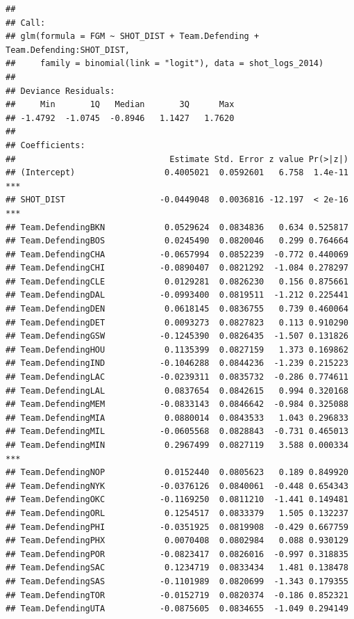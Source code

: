 \documentclass[
]{book}
\theoremstyle{definition}
\theoremstyle{definition}
\theoremstyle{definition}
\theoremstyle{definition}
\theoremstyle{remark}
\begin{document}
\begin{verbatim}
## 
## Call:
## glm(formula = FGM ~ SHOT_DIST + Team.Defending + Team.Defending:SHOT_DIST, 
##     family = binomial(link = "logit"), data = shot_logs_2014)
## 
## Deviance Residuals: 
##     Min       1Q   Median       3Q      Max  
## -1.4792  -1.0745  -0.8946   1.1427   1.7620  
## 
## Coefficients:
##                               Estimate Std. Error z value Pr(>|z|)    
## (Intercept)                  0.4005021  0.0592601   6.758  1.4e-11 ***
## SHOT_DIST                   -0.0449048  0.0036816 -12.197  < 2e-16 ***
## Team.DefendingBKN            0.0529624  0.0834836   0.634 0.525817    
## Team.DefendingBOS            0.0245490  0.0820046   0.299 0.764664    
## Team.DefendingCHA           -0.0657994  0.0852239  -0.772 0.440069    
## Team.DefendingCHI           -0.0890407  0.0821292  -1.084 0.278297    
## Team.DefendingCLE            0.0129281  0.0826230   0.156 0.875661    
## Team.DefendingDAL           -0.0993400  0.0819511  -1.212 0.225441    
## Team.DefendingDEN            0.0618145  0.0836755   0.739 0.460064    
## Team.DefendingDET            0.0093273  0.0827823   0.113 0.910290    
## Team.DefendingGSW           -0.1245390  0.0826435  -1.507 0.131826    
## Team.DefendingHOU            0.1135399  0.0827159   1.373 0.169862    
## Team.DefendingIND           -0.1046288  0.0844236  -1.239 0.215223    
## Team.DefendingLAC           -0.0239311  0.0835732  -0.286 0.774611    
## Team.DefendingLAL            0.0837654  0.0842615   0.994 0.320168    
## Team.DefendingMEM           -0.0833143  0.0846642  -0.984 0.325088    
## Team.DefendingMIA            0.0880014  0.0843533   1.043 0.296833    
## Team.DefendingMIL           -0.0605568  0.0828843  -0.731 0.465013    
## Team.DefendingMIN            0.2967499  0.0827119   3.588 0.000334 ***
## Team.DefendingNOP            0.0152440  0.0805623   0.189 0.849920    
## Team.DefendingNYK           -0.0376126  0.0840061  -0.448 0.654343    
## Team.DefendingOKC           -0.1169250  0.0811210  -1.441 0.149481    
## Team.DefendingORL            0.1254517  0.0833379   1.505 0.132237    
## Team.DefendingPHI           -0.0351925  0.0819908  -0.429 0.667759    
## Team.DefendingPHX            0.0070408  0.0802984   0.088 0.930129    
## Team.DefendingPOR           -0.0823417  0.0826016  -0.997 0.318835    
## Team.DefendingSAC            0.1234719  0.0833434   1.481 0.138478    
## Team.DefendingSAS           -0.1101989  0.0820699  -1.343 0.179355    
## Team.DefendingTOR           -0.0152719  0.0820374  -0.186 0.852321    
## Team.DefendingUTA           -0.0875605  0.0834655  -1.049 0.294149    

\end{verbatim}
\end{document}
